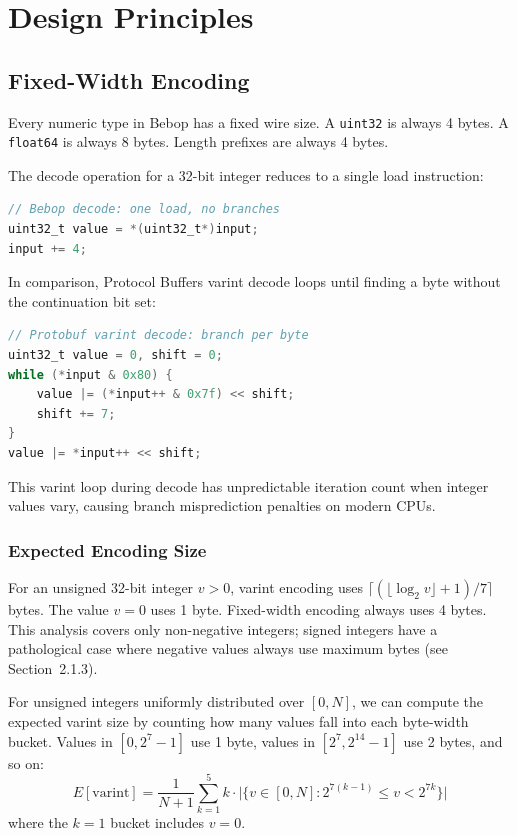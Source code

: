 \documentclass[11pt,onecolumn]{article}
\begin{document}
\section{Design Principles}

\subsection{Fixed-Width Encoding}

Every numeric type in Bebop has a fixed wire size. A \texttt{uint32} is always 4 bytes. A \texttt{float64} is always 8 bytes. Length prefixes are always 4 bytes.

\begin{minipage}{\textwidth}
The decode operation for a 32-bit integer reduces to a single load instruction:

\begin{lstlisting}[language=C]
// Bebop decode: one load, no branches
uint32_t value = *(uint32_t*)input;
input += 4;
\end{lstlisting}

In comparison, Protocol Buffers varint decode loops until finding a byte without the continuation bit set:

\begin{lstlisting}[language=C]
// Protobuf varint decode: branch per byte
uint32_t value = 0, shift = 0;
while (*input & 0x80) {
    value |= (*input++ & 0x7f) << shift;
    shift += 7;
}
value |= *input++ << shift;
\end{lstlisting}

This varint loop during decode has unpredictable iteration count when integer values vary, causing branch misprediction penalties on modern CPUs.
\end{minipage}

\subsubsection{Expected Encoding Size}

For an unsigned 32-bit integer $v > 0$, varint encoding uses $\lceil (\lfloor \log_2 v \rfloor + 1) / 7 \rceil$ bytes. The value $v = 0$ uses 1 byte. Fixed-width encoding always uses 4 bytes. This analysis covers only non-negative integers; signed integers have a pathological case where negative values always use maximum bytes (see Section~2.1.3).

For unsigned integers uniformly distributed over $[0, N]$, we can compute the expected varint size by counting how many values fall into each byte-width bucket. Values in $[0, 2^7-1]$ use 1 byte, values in $[2^7, 2^{14}-1]$ use 2 bytes, and so on:
\begin{equation}
E[\text{varint}] = \frac{1}{N+1} \sum_{k=1}^{5} k \cdot \bigl|\{v \in [0,N] : 2^{7(k-1)} \leq v < 2^{7k}\}\bigr|
\label{eq:varint-expected}
\end{equation}
where the $k=1$ bucket includes $v=0$.
\end{document}
